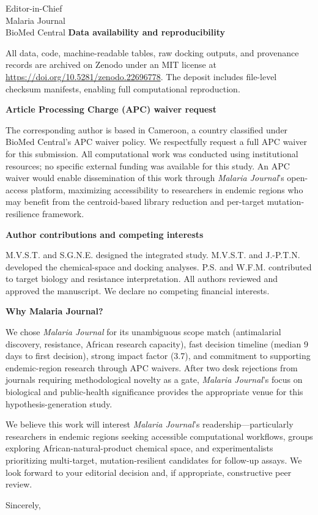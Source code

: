 \documentclass[11pt,a4paper]{letter}
\begin{document}
\begin{letter}{Editor-in-Chief\\
Malaria Journal\\
BioMed Central}
\textbf{Data availability and reproducibility}

All data, code, machine-readable tables, raw docking outputs, and provenance records are archived on Zenodo under an MIT license at \url{https://doi.org/10.5281/zenodo.22696778}. The deposit includes file-level checksum manifests, enabling full computational reproduction.

\textbf{Article Processing Charge (APC) waiver request}

The corresponding author is based in Cameroon, a country classified under BioMed Central's APC waiver policy. We respectfully request a full APC waiver for this submission. All computational work was conducted using institutional resources; no specific external funding was available for this study. An APC waiver would enable dissemination of this work through \emph{Malaria Journal}'s open-access platform, maximizing accessibility to researchers in endemic regions who may benefit from the centroid-based library reduction and per-target mutation-resilience framework.

\textbf{Author contributions and competing interests}

M.V.S.T. and S.G.N.E. designed the integrated study. M.V.S.T. and J.-P.T.N. developed the chemical-space and docking analyses. P.S. and W.F.M. contributed to target biology and resistance interpretation. All authors reviewed and approved the manuscript. We declare no competing financial interests.

\textbf{Why Malaria Journal?}

We chose \emph{Malaria Journal} for its unambiguous scope match (antimalarial discovery, resistance, African research capacity), fast decision timeline (median 9 days to first decision), strong impact factor (3.7), and commitment to supporting endemic-region research through APC waivers. After two desk rejections from journals requiring methodological novelty as a gate, \emph{Malaria Journal}'s focus on biological and public-health significance provides the appropriate venue for this hypothesis-generation study.

We believe this work will interest \emph{Malaria Journal}'s readership—particularly researchers in endemic regions seeking accessible computational workflows, groups exploring African-natural-product chemical space, and experimentalists prioritizing multi-target, mutation-resilient candidates for follow-up assays. We look forward to your editorial decision and, if appropriate, constructive peer review.

\closing{Sincerely,}

\end{letter}
\end{document}
